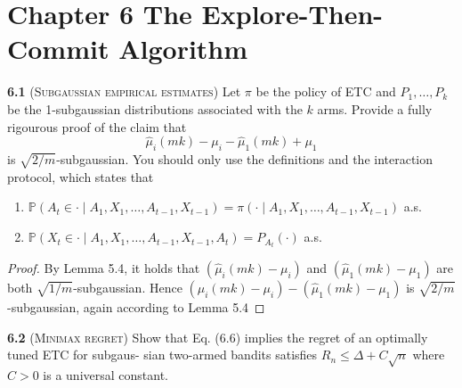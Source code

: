 \chapter*{Chapter 6 The Explore-Then-Commit Algorithm}
\label{sec:6}

\noindent\textbf{6.1} (\textsc{Subgaussian empirical estimates})
Let $\pi$ be the policy of ETC and $P_{1}, \ldots, P_{k}$ be the 1-subgaussian distributions associated with the $k$ arms.
Provide a fully rigourous proof of the claim that
    $$\hat{\mu}_{i}(m k)-\mu_{i}-\hat{\mu}_{1}(m k)+\mu_{1}$$
is $\sqrt{2 / m}$-subgaussian.
You should only use the definitions and the interaction protocol, which states that
\begin{enumerate}
    \item $\mathbb{P}\left(A_{t} \in \cdot \mid A_{1}, X_{1}, \ldots, A_{t-1}, X_{t-1}\right)=\pi\left(\cdot \mid A_{1}, X_{1}, \ldots, A_{t-1}, X_{t-1}\right)$ a.s.
    \item $\mathbb{P}\left(X_{t} \in \cdot \mid A_{1}, X_{1}, \ldots, A_{t-1}, X_{t-1}, A_{t}\right)=P_{A_{t}}(\cdot)$ a.s.
\end{enumerate}

\begin{proof}
    By Lemma 5.4, it holds that $(\hat{\mu}_{i}(m k)-\mu_{i})$ and $(\hat{\mu}_{1}(m k)-\mu_{1})$ are both $\sqrt{1 / m}$-subgaussian.
    Hence $(\hat{\mu}_{i}(m k)-\mu_{i}) - (\hat{\mu}_{1}(m k)-\mu_{1})$ is $\sqrt{2 / m}$-subgaussian, again according to Lemma 5.4
\end{proof}

\noindent\textbf{6.2} (\textsc{Minimax regret})
Show that Eq. (6.6) implies the regret of an optimally tuned ETC for subgaus-
sian two-armed bandits satisfies $R_{n} \leq \Delta+C \sqrt{n}$ where $C>0$ is a universal constant.

